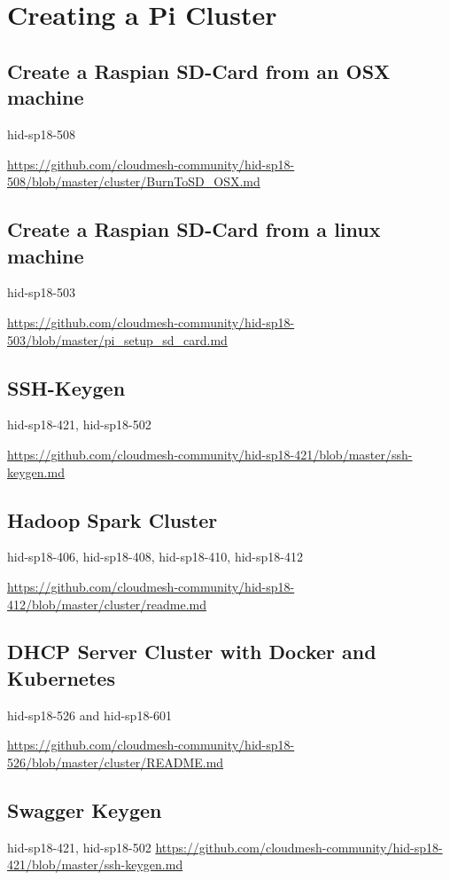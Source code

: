 \chapter{Creating a Pi Cluster}

\section{Create a Raspian SD-Card from an OSX machine}

hid-sp18-508

\url{https://github.com/cloudmesh-community/hid-sp18-508/blob/master/cluster/BurnToSD_OSX.md}


\section{Create a Raspian SD-Card from a linux machine}

hid-sp18-503 

\url{https://github.com/cloudmesh-community/hid-sp18-503/blob/master/pi_setup_sd_card.md}

\section{SSH-Keygen}

hid-sp18-421, hid-sp18-502

\url{https://github.com/cloudmesh-community/hid-sp18-421/blob/master/ssh-keygen.md}


\section{Hadoop Spark Cluster }

hid-sp18-406,  hid-sp18-408, hid-sp18-410, hid-sp18-412

\url{https://github.com/cloudmesh-community/hid-sp18-412/blob/master/cluster/readme.md}

 

\section{DHCP Server Cluster with Docker and Kubernetes }

hid-sp18-526 and hid-sp18-601

\url{https://github.com/cloudmesh-community/hid-sp18-526/blob/master/cluster/README.md}


\section{Swagger Keygen}
hid-sp18-421, hid-sp18-502
\url{https://github.com/cloudmesh-community/hid-sp18-421/blob/master/ssh-keygen.md}

